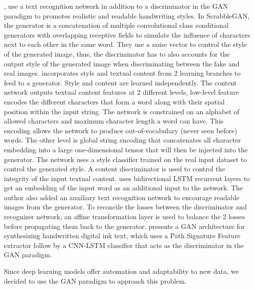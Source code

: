 \documentclass[12pt]{report}
\begin{document}
\cite{scrabble-gan}, \cite{gan-writting} use a text recognition network in addition to a discriminator in the GAN paradigm to promotes realistic and readable handwriting styles. In ScrabbleGAN\cite{scrabble-gan}, the generator is a concatenation of multiple convolutional class conditional generators with overlapping receptive fields to simulate the influence of characters next to each other in the same word. They use a noise vector to control the style of the generated image, thus, the discriminator has to also accounts for the output style of the generated image when discriminating between the fake and real images.
\cite{gan-writting} incorporates style and textual content from 2 learning branches to feed to a generator. Style and content are learned independently. The content network outputs textual content features at 2 different levels, low-level feature encodes the different characters that form a word along with their spatial position within the input string. The network is constrained on an alphabet of allowed characters and maximum character length a word can have. This encoding allows the network to produce out-of-vocabulary (never seen before) words. The other level is global string encoding that concatenates all character embedding into a large one-dimensional tensor that will then be injected into the generator.
The network uses a style classifier trained on the real input dataset to control the generated style. A content discriminator is used to control the integrity of the input textual content.
\cite{adversarial-gen} uses bidirectional LSTM recurrent layers \cite{lstm} to get an embedding of the input word as an additional input to the network. The author also added an auxiliary text recognition network to encourage readable images from the generator. To reconcile the losses between the discriminator and recognizer network, an affine transformation layer is used to balance the 2 losses before propagating them back to the generator.
\cite{hw-gan} presents a GAN architecture for synthesizing handwritten digital ink text, which uses a Path Signature Feature extractor follow by a CNN-LSTM classifier that acts as the discriminator in the GAN paradigm.

Since deep learning models offer automation and adaptability to new data, we decided to use the GAN paradigm to approach this problem.
\end{document}
